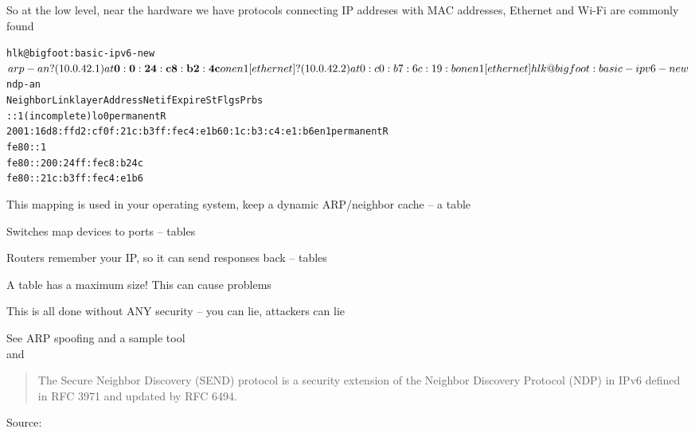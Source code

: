 \documentclass[Screen16to9,17pt]{foils}
\begin{document}

So at the low level, near the hardware we have protocols connecting IP addreses with MAC addresses, Ethernet and Wi-Fi are commonly found

\begin{alltt}
\small
hlk@bigfoot:basic-ipv6-new$ arp -an
? (10.0.42.1) at{\bf 0:0:24:c8:b2:4c} on en1 [ethernet]
? (10.0.42.2) at 0:c0:b7:6c:19:b on en1 [ethernet]

hlk@bigfoot:basic-ipv6-new$ ndp -an
Neighbor                      Linklayer Address  Netif Expire    St Flgs Prbs
::1                           (incomplete)         lo0 permanent R
2001:16d8:ffd2:cf0f:21c:b3ff:fec4:e1b6 0:1c:b3:c4:e1:b6 en1 permanent R
fe80::1%lo0                   (incomplete)         lo0 permanent R
fe80::200:24ff:fec8:b24c%en1 {\bf 0:0:24:c8:b2:4c}      en1 8h54m51s  S  R
fe80::21c:b3ff:fec4:e1b6%en1  0:1c:b3:c4:e1:b6     en1 permanent R
\end{alltt}


\begin{list2}
\item This mapping is used in your operating system, keep a dynamic ARP/neighbor cache -- a table
\item Switches map devices to ports -- tables
\item Routers remember your IP, so it can send responses back -- tables
\item A table has a maximum size! This can cause problems {\myalert}
\item This is all done without ANY security -- you can lie, attackers can lie
\item See ARP spoofing and a sample tool  \\
and 
\end{list2}




\begin{quote}
The Secure Neighbor Discovery (SEND) protocol is a security extension of the Neighbor Discovery Protocol (NDP) in IPv6 defined in RFC 3971 and updated by RFC 6494.
\end{quote}
Source: 
\end{document}
